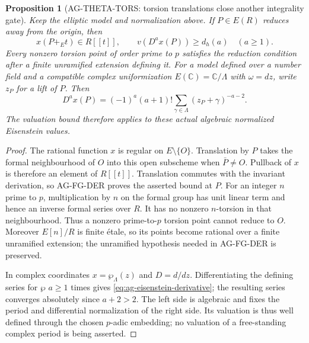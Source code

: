 \documentclass[11pt,a4paper]{article}
\newtheorem{proposition}{Proposition}
\begin{document}
\begin{proposition}[AG-THETA-TORS: torsion translations close another integrality gate]
Keep the elliptic model and normalization above. If $P\in E(R)$
reduces away from the origin, then
\[
 x(P+_E t)\in R[[t]],\qquad
 v(D^a x(P))\ge d_h(a)\quad(a\ge1).
\]
Every nonzero torsion point of order prime to $p$ satisfies the
reduction condition after a finite unramified extension defining
it. For a model defined over a number field and a compatible
complex uniformization $E(\mathbb C)=\mathbb C/\Lambda$ with
$\omega=dz$, write $z_P$ for a lift of $P$. Then
\begin{equation}\label{eq:ag-eisenstein-derivative}
 D^a x(P)=(-1)^a(a+1)!
     \sum_{\gamma\in\Lambda}(z_P+\gamma)^{-a-2}.
\end{equation}
The valuation bound therefore applies to these actual algebraic
normalized Eisenstein values.
\end{proposition}
\begin{proof}
The rational function $x$ is regular on $E\setminus\{O\}$.
Translation by $P$ takes the formal neighbourhood of $O$ into
this open subscheme when $\bar P\ne O$. Pullback of $x$ is
therefore an element of $R[[t]]$. Translation commutes with the
invariant derivation, so AG-FG-DER proves the asserted bound at $P$.
For an integer $n$ prime to $p$, multiplication by $n$ on the
formal group has unit linear term and hence an inverse formal
series over $R$. It has no nonzero $n$-torsion in that
neighbourhood. Thus a nonzero prime-to-$p$ torsion point cannot
reduce to $O$. Moreover $E[n]/R$ is finite \'etale, so its
points become rational over a finite unramified extension;
the unramified hypothesis needed in AG-FG-DER is preserved.

In complex coordinates $x=\wp_\Lambda(z)$ and $D=d/dz$.
Differentiating the defining series for $\wp$ $a\ge1$ times
gives \eqref{eq:ag-eisenstein-derivative}; the resulting series
converges absolutely since $a+2>2$. The left side is algebraic
and fixes the period and differential normalization of the
right side. Its valuation is thus well defined through the
chosen $p$-adic embedding; no valuation of a free-standing
complex period is being asserted.
\end{proof}
\end{document}
